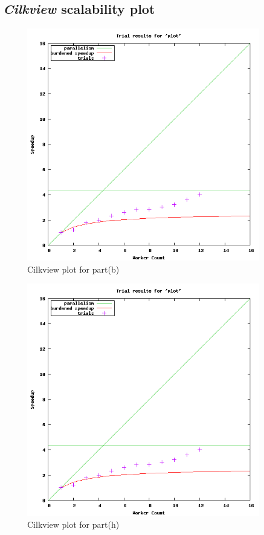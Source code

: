 \documentclass{article}
\begin{document}
\subsection{\textit{Cilkview} scalability plot}
\begin{figure}[h!]
  \begin{center}
    \includegraphics[width=4in]{plots/plot_part_b.png}
    \caption{Cilkview plot for part(b)}
    \label{fig:cilkview_b}
  \end{center}
\end {figure}

\begin{figure}[h!]
  \begin{center}
    \includegraphics[width=4in]{plots/plot_part_h.png}
    \caption{Cilkview plot for part(h)}
    \label{fig:cilkview_h}
  \end{center}
\end {figure}
\end{document}
